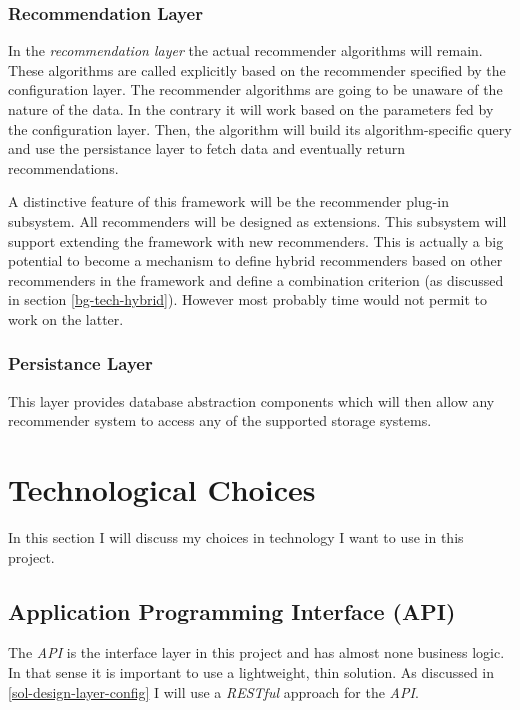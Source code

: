 \subsubsection{Recommendation Layer}
\label{sol-design-layer-reco}

In the \emph{recommendation layer} the actual recommender algorithms will remain. These algorithms are called explicitly based on the recommender specified by the configuration layer. The recommender algorithms are going to be unaware of the nature of the data. In the contrary it will work based on the parameters fed by the configuration layer. Then, the algorithm will build its algorithm-specific query and use the persistance layer to fetch data and eventually return recommendations.

A distinctive feature of this framework will be the recommender plug-in subsystem. All recommenders will be designed as extensions. This subsystem will support extending the framework with new recommenders. This is actually a big potential to become a mechanism to define hybrid recommenders based on other recommenders in the framework and define a combination criterion (as discussed in section \ref{bg-tech-hybrid}). However most probably time would not permit to work on the latter.

\subsubsection{Persistance Layer}

This layer provides database abstraction components which will then allow any recommender system to access any of the supported storage systems.



\section{Technological Choices}

In this section I will discuss my choices in technology I want to use in this project.

\subsection{Application Programming Interface (API)}

The \emph{API} is the interface layer in this project and has almost none business logic. In that sense it is important to use a lightweight, thin solution. As discussed in \ref{sol-design-layer-config} I will use a \emph{RESTful} approach for the \emph{API}.

